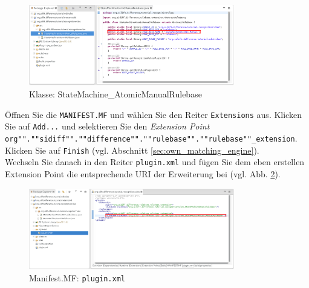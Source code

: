 \begin{figure}[H]
\centering
\includegraphics[width=0.8\textwidth]{recognitionrules/graphics/silift-rulebase_class.png}
\caption{Klasse: StateMachine\_AtomicManualRulebase}
\label{silift-rulebase_class}
\end{figure}

Öffnen Sie die \texttt{MANIFEST.MF} und wählen Sie den Reiter \texttt{Extensions} aus. 
Klicken Sie auf \texttt{Add...} und selektieren Sie den \textit{Extension Point} \texttt{org"".""sidiff"".""difference"".""rulebase"".""rulebase""\_extension}. Klicken Sie auf \texttt{Finish} (vgl. Abschnitt \ref{sec:own_matching_engine}).\\
Wechseln Sie danach in den Reiter \texttt{plugin.xml} und fügen Sie dem eben erstellen Extension Point die entsprechende URI der Erweiterung bei (vgl. Abb. \ref{silift-plugin_rulebase_manifest_plugin}).

\begin{figure}[H]
\centering
\includegraphics[width=0.8\textwidth]{recognitionrules/graphics/silift-plugin_rulebase_manifest_plugin.png}
\caption{Manifest.MF: \texttt{plugin.xml}}
\label{silift-plugin_rulebase_manifest_plugin}
\end{figure}

